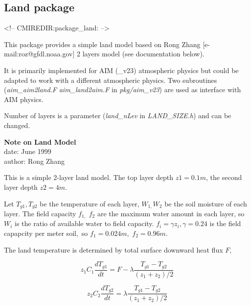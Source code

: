 \subsection{Land package}
\label{sec:pkg:land}
\begin{rawhtml}
<!-- CMIREDIR:package_land: -->
\end{rawhtml}

This package provides a simple land model
based on Rong Zhang [e-mail:roz@gfdl.noaa.gov] 2 layers model
(see documentation below).

It is primarily implemented for AIM (\_v23) atmospheric physics
but could be adapted to work with a different atmospheric physics.
Two subroutines ({\it aim\_aim2land.F} {\it aim\_land2aim.F}
in {\it pkg/aim\_v23}) are used as interface with AIM physics. 

Number of layers is a parameter ({\it land\_nLev} in {\it LAND\_SIZE.h})
and can be changed. 



% 

\begin{center}
{\bf Note on Land Model}\\
date: June 1999\\
author: Rong Zhang\\
\end{center}


This is a simple 2-layer land model. The top layer depth $z1=0.1m$, the
second layer depth $z2=4m$.

Let $T_{g1},T_{g2}$ be the temperature of each layer, $W_{1,}W_{2}$ be the
soil moisture of each layer. The field capacity $f_{1,}$ $f_{2}$ are the
maximum water amount in each layer, so $W_{i}$ is the ratio of available
water to field capacity. $f_{i}=\gamma z_{i},\gamma =0.24$ is the field
capapcity per meter soil$,$ so $f_{1}=0.024m,$ $f_{2}=0.96m.$

The land temperature is determined by total surface downward heat flux $F,$

\begin{equation}
z_{1}C_{1}\frac{dT_{g1}}{dt}=F-\lambda \frac{T_{g1}-T_{g2}}{(z_{1}+z_{2})/2}
\end{equation}

\begin{center}
\begin{equation}
z_{2}C_{2}\frac{dT_{g2}}{dt}=\lambda \frac{T_{g1}-T_{g2}}{(z_{1}+z_{2})/2}
\end{equation}
\end{center}

